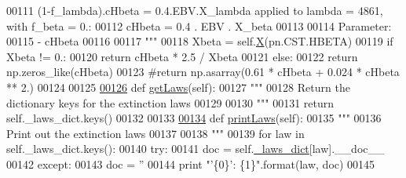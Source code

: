 \begin{DoxyCode}
00111 \textcolor{stringliteral}{            (1-f\_lambda).cHbeta = 0.4.EBV.X\_lambda applied to lambda = 4861, with f\_beta = 0.:}
00112 \textcolor{stringliteral}{            cHbeta = 0.4 . EBV . X\_beta}
00113 \textcolor{stringliteral}{        }
00114 \textcolor{stringliteral}{        Parameter:}
00115 \textcolor{stringliteral}{            - cHbeta}
00116 \textcolor{stringliteral}{            }
00117 \textcolor{stringliteral}{        """}
00118         Xbeta = self.\hyperlink{classpyneb_1_1extinction_1_1red__corr_1_1_red_corr_aac92bb80311cda78c01e61aa44655251}{X}(pn.CST.HBETA)
00119         \textcolor{keywordflow}{if} Xbeta != 0.:
00120             \textcolor{keywordflow}{return} cHbeta * 2.5 / Xbeta
00121         \textcolor{keywordflow}{else}:
00122             \textcolor{keywordflow}{return} np.zeros\_like(cHbeta)
00123         \textcolor{comment}{#return np.asarray(0.61 * cHbeta + 0.024 * cHbeta ** 2.)}
00124     
00125     
\hypertarget{red__corr_8py_source_l00126}{}\hyperlink{classpyneb_1_1extinction_1_1red__corr_1_1_red_corr_a8040208c6f193358ed1af2ced21fdd26}{00126}     \textcolor{keyword}{def }\hyperlink{classpyneb_1_1extinction_1_1red__corr_1_1_red_corr_a8040208c6f193358ed1af2ced21fdd26}{getLaws}(self):
00127         \textcolor{stringliteral}{"""}
00128 \textcolor{stringliteral}{        Return the dictionary keys for the extinction laws}
00129 \textcolor{stringliteral}{        }
00130 \textcolor{stringliteral}{        """}
00131         \textcolor{keywordflow}{return} self.\_laws\_dict.keys()
00132     
00133     
\hypertarget{red__corr_8py_source_l00134}{}\hyperlink{classpyneb_1_1extinction_1_1red__corr_1_1_red_corr_a95b4079c79dc6128406d0f992fa60e12}{00134}     \textcolor{keyword}{def }\hyperlink{classpyneb_1_1extinction_1_1red__corr_1_1_red_corr_a95b4079c79dc6128406d0f992fa60e12}{printLaws}(self):
00135         \textcolor{stringliteral}{"""}
00136 \textcolor{stringliteral}{        Print out the extinction laws}
00137 \textcolor{stringliteral}{        }
00138 \textcolor{stringliteral}{        """}
00139         \textcolor{keywordflow}{for} law \textcolor{keywordflow}{in} self.\_laws\_dict.keys():
00140             \textcolor{keywordflow}{try}:
00141                 doc = self.\hyperlink{classpyneb_1_1extinction_1_1red__corr_1_1_red_corr_a96fbed6f54a26dd2f59fe6441c9c3865}{\_laws\_dict}[law].\_\_doc\_\_
00142             \textcolor{keywordflow}{except}:
00143                 doc = \textcolor{stringliteral}{''}
00144             \textcolor{keywordflow}{print} \textcolor{stringliteral}{"'\{0\}': \{1\}"}.format(law, doc)
00145                          

\end{DoxyCode}
